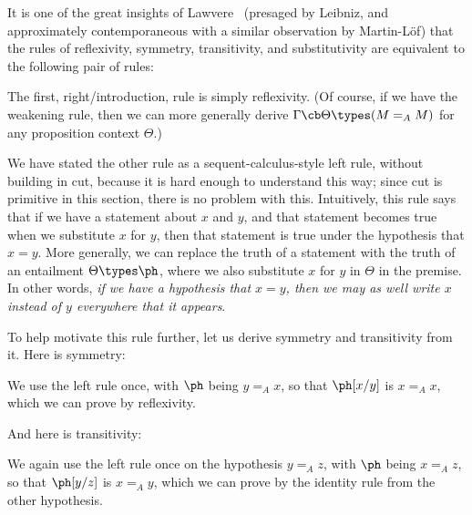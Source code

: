It is one of the great insights of Lawvere~\cite{lawvere:comprehension} (presaged by Leibniz, and approximately contemporaneous with a similar observation by Martin-L\"of) that the rules of reflexivity, symmetry, transitivity, and substitutivity are equivalent to the following pair of rules:
The first, right/introduction, rule is simply reflexivity.
(Of course, if we have the weakening rule, then we can more generally derive $\Gamma\cb \Theta\types (M=_A M)$ for any proposition context $\Theta$.)

We have stated the other rule as a sequent-calculus-style left rule, without building in cut, because it is hard enough to understand this way; since cut is primitive in this section, there is no problem with this.
Intuitively, this rule says that if we have a statement about $x$ and $y$, and that statement becomes true when we substitute $x$ for $y$, then that statement is true under the hypothesis that $x=y$.
More generally, we can replace the truth of a statement with the truth of an entailment $\Theta\types \ph$, where we also substitute $x$ for $y$ in $\Theta$ in the premise.
In other words, \emph{if we have a hypothesis that $x=y$, then we may as well write $x$ instead of $y$ everywhere that it appears}.

To help motivate this rule further, let us derive symmetry and transitivity from it.
Here is symmetry:
\begin{mathpar}
\end{mathpar}
We use the left rule once, with $\ph$ being $y=_A x$, so that $\ph[x/y]$ is $x=_A x$, which we can prove by reflexivity.

And here is transitivity:
\begin{mathpar}
\end{mathpar}
We again use the left rule once on the hypothesis $y=_A z$, with $\ph$ being $x=_A z$, so that $\ph[y/z]$ is $x=_A y$, which we can prove by the identity rule from the other hypothesis.

